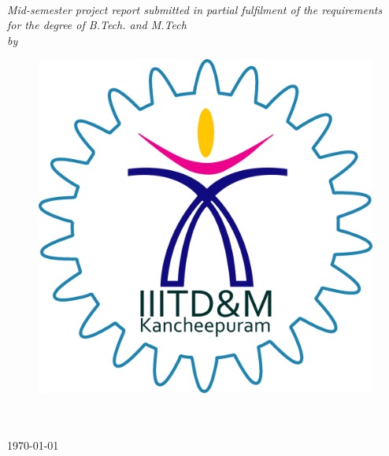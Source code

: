 \documentclass[11pt, a4paper, oneside]{Thesis} %
\begin{document}
\begin{titlepage}
\begin{center}


\vspace{0.4cm} %
{\huge \bfseries \ttitle}\\[0.4cm] %
\vspace{1.5cm} %

 
 \large \textit{Mid-semester project report submitted in partial fulfilment of the requirements\\ for the degree of B.Tech. and M.Tech}\\[0.3cm] %
\textit{by}\\[0.4cm]

\authornames

\vfill
\graphicspath{ {./Figures/} }
\begin{figure}[hb]
  \centering
  \includegraphics[width=0.35\linewidth]{iiitdm.png}
\end{figure}

\DEPTNAME\\ %
\textsc{ \UNIVNAME}\\[1.5cm] %
\large \today\\[2cm] %


\end{center}

\end{titlepage}

\end{document}
